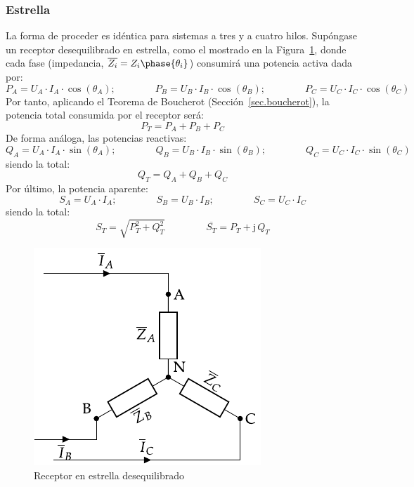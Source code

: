 \documentclass[11pt]{book} %
\begin{document}
	\subsubsection{Estrella}
	La forma de proceder es idéntica para sistemas a tres y a cuatro hilos. Supóngase un receptor desequilibrado en estrella, como el mostrado en la Figura~\ref{fig.estrellaDesequilibrado_potencia}, donde cada fase (impedancia, $\overline{Z_i}=Z_i\phase{\theta_i}$) consumirá una potencia activa dada por: 
	\begin{equation*}
	    P_A=U_{A}\cdot I_A \cdot \cos(\theta_A);\qquad \qquad
	    P_B=U_{B}\cdot I_B \cdot \cos(\theta_B);\qquad \qquad
	    P_C=U_{C}\cdot I_C \cdot \cos(\theta_C)
	\end{equation*}
	Por tanto, aplicando el Teorema de Boucherot (Sección~\ref{sec.boucherot}), la potencia total consumida por el receptor será:
	\begin{equation}
	    \boxed{P_T=P_A+P_B+P_C}
	\end{equation}
	De forma análoga, las potencias reactivas:
	\begin{equation*}
	    Q_A=U_{A}\cdot I_A \cdot \sin(\theta_A);\qquad \qquad
	    Q_B=U_{B}\cdot I_B \cdot \sin(\theta_B);\qquad \qquad
	    Q_C=U_{C}\cdot I_C \cdot \sin(\theta_C)
	\end{equation*}
	siendo la total: 
	\begin{equation}
	    \boxed{Q_T=Q_A+Q_B+Q_C}
	\end{equation}
	Por último, la potencia aparente: 
	\begin{equation*}
	    S_A=U_{A}\cdot I_A;\qquad \qquad
	    S_B=U_{B}\cdot I_B;\qquad \qquad
	    S_C=U_{C}\cdot I_C
	\end{equation*}
	siendo la total: 
	\begin{equation}
	    \boxed{S_T=\sqrt{P_T^2+Q_T^2}}\,\qquad\qquad \boxed{\overline{S_T}=P_T+\mathrm{j}\,Q_T}
	\end{equation}
	
	\begin{figure}[htbp]
	    \centering
	    \includegraphics{../figs/EstrellaDesequilibrado_Receptor_SN.pdf}
	    \caption{Receptor en estrella desequilibrado}
	    \label{fig.estrellaDesequilibrado_potencia}
	\end{figure}
	
\end{document}

